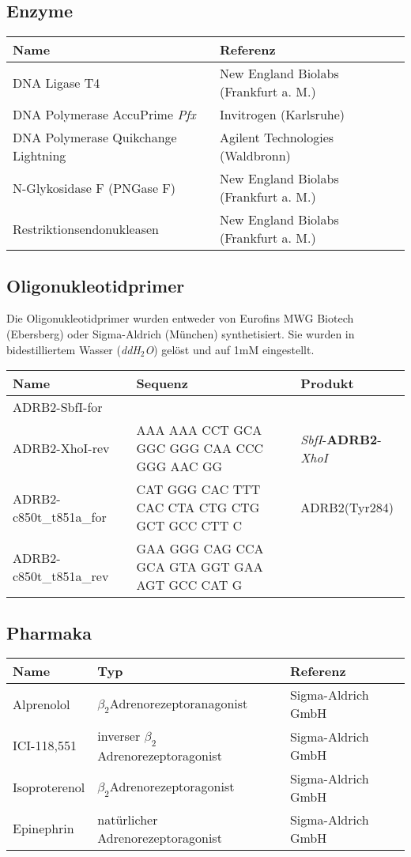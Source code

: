 \subsection{Enzyme}
\begin{table}[htsb]
\begin{tabularx}{\textwidth}{lll}
\toprule
Name							&	Referenz\\
\midrule
DNA Ligase T4							&	New England Biolabs (Frankfurt a. M.)\\
DNA Polymerase AccuPrime \textit{Pfx}	&	Invitrogen (Karlsruhe)\\
DNA Polymerase Quikchange Lightning		&	Agilent Technologies (Waldbronn)\\
N-Glykosidase F (PNGase F)				&	New England Biolabs (Frankfurt a. M.)\\
Restriktionsendonukleasen				&	New England Biolabs (Frankfurt a. M.)\\
\bottomrule
\end {tabularx}
\end{table}

\subsection{Oligonukleotidprimer}
Die Oligonukleotidprimer wurden entweder von Eurofins MWG Biotech (Ebersberg) oder Sigma-Aldrich (München) synthetisiert. Sie wurden in bidestilliertem Wasser (\textit{ddH$_2$O}) gelöst und auf 1\si{\milli M} eingestellt. 
\begin{table}[htsb] 
\begin{tabularx}{\textwidth}{lXl}
\toprule
Name		&	Sequenz 					&	Produkt\\
\midrule
ADRB2-SbfI-for	&&\\
ADRB2-XhoI-rev	&	AAA AAA CCT GCA GGC GGG CAA CCC GGG AAC GG	&	\textit{SbfI}-\textbf{ADRB2}-\textit{XhoI}\\
ADRB2-c850t\_t851a\_for	& 	CAT GGG CAC TTT CAC CTA CTG CTG GCT GCC CTT C & ADRB2(Tyr284)\\
ADRB2-c850t\_t851a\_rev	&	GAA GGG CAG CCA GCA GTA GGT GAA AGT GCC CAT G &\\
\bottomrule
\end{tabularx}
\end{table}

\subsection{Pharmaka}
\begin{tabularx}{\textwidth}{lll}
\toprule
Name			&	Typ										&	Referenz\\
\midrule
Alprenolol		&	$\beta_2$\-Adrenorezeptoranagonist				&	Sigma-Aldrich GmbH\\
ICI-118,551		&	inverser $\beta_2$\-Adrenorezeptoragonist		&	Sigma-Aldrich GmbH\\
Isoproterenol	&	$\beta_2$\-Adrenorezeptoragonist				&	Sigma-Aldrich GmbH\\
Epinephrin		&	natürlicher Adrenorezeptoragonist				& 	Sigma-Aldrich GmbH\\
\bottomrule
\end{tabularx}

